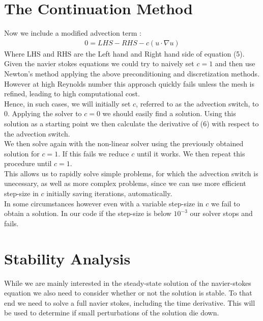 \documentclass[11pt,twoside,a4paper]{article}
\begin{document}
\section{The Continuation Method}
Now we include a modified advection term : 
\begin{align}
0 = LHS - RHS - c ( u \cdot \nabla u) 
\end{align}
Where LHS and RHS are the Left hand and Right hand side of equation (5).\\
Given the navier stokes equations we could try to naively set $c = 1$ and then use Newton's method applying the above preconditioning and discretization methods. However at high Reynolds number this approach quickly fails unless the mesh is refined, leading to high computational cost.\\
Hence, in such cases, we will initially set $c$, referred to as the advection switch, to $0$. Applying the solver to $c = 0$ we should easily find a solution. Using this solution as a starting point we then calculate the derivative of (6) with respect to the advection switch.\\
We then solve again with the non-linear solver using the previously obtained solution for $c = 1$. If this fails we reduce $c$ until it works. We then repeat this procedure until $c = 1$.\\
 This allows us to rapidly solve simple problems, for which the advection switch is unecessary, as well as more complex problems, since we can use more efficient step-size in $c$ initially saving iterations, automatically.\\
In some circumstances however even with a variable step-size in $c$ we fail to obtain a solution. In our code if the step-size is below $10^{-3}$ our solver stops and fails.

\section{Stability Analysis}

While we are mainly interested in the steady-state solution of the navier-stokes equation we also need to consider whether or not the solution is stable. To that end we need to solve a full navier stokes, including the time derivative. This will be used to determine if small perturbations of the solution die down.
\end{document}
